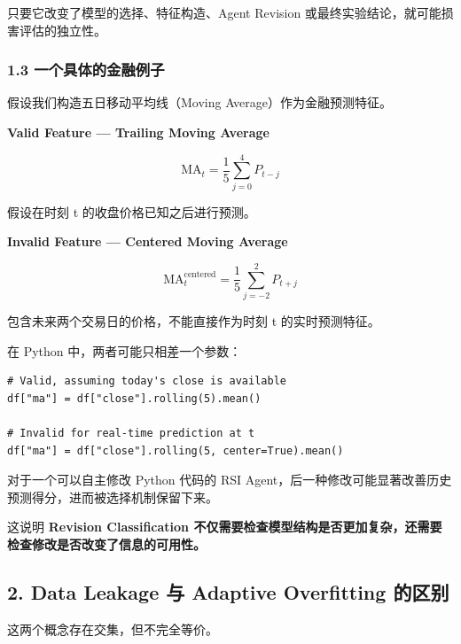 只要它改变了模型的选择、特征构造、Agent Revision 或最终实验结论，就可能损害评估的独立性。

\hypertarget{part-2-23-0001-ux4e00ux4e2aux5177ux4f53ux7684ux91d1ux878dux4f8bux5b50}{%
\subsubsection{1.3 一个具体的金融例子}\label{part-2-23-0001-ux4e00ux4e2aux5177ux4f53ux7684ux91d1ux878dux4f8bux5b50}}

假设我们构造五日移动平均线（Moving Average）作为金融预测特征。

\textbf{Valid Feature --- Trailing Moving Average}


\[\mathrm{MA}_t
  =
  \frac15\sum_{j=0}^{4}P_{t-j}\]

假设在时刻 t 的收盘价格已知之后进行预测。

\textbf{Invalid Feature --- Centered Moving Average}


\[\mathrm{MA}_t^{\mathrm{centered}}
  =
  \frac15\sum_{j=-2}^{2}P_{t+j}\]

包含未来两个交易日的价格，不能直接作为时刻 t 的实时预测特征。

在 Python 中，两者可能只相差一个参数：

\begin{verbatim}
# Valid, assuming today's close is available
df["ma"] = df["close"].rolling(5).mean()

# Invalid for real-time prediction at t
df["ma"] = df["close"].rolling(5, center=True).mean()
\end{verbatim}

对于一个可以自主修改 Python 代码的 RSI Agent，后一种修改可能显著改善历史预测得分，进而被选择机制保留下来。

这说明 \textbf{Revision Classification 不仅需要检查模型结构是否更加复杂，还需要检查修改是否改变了信息的可用性。}

\hypertarget{part-2-23-0001-data-leakage-ux4e0e-adaptive-overfitting-ux7684ux533aux522b}{%
\subsection{2. Data Leakage 与 Adaptive Overfitting 的区别}\label{part-2-23-0001-data-leakage-ux4e0e-adaptive-overfitting-ux7684ux533aux522b}}

这两个概念存在交集，但不完全等价。

